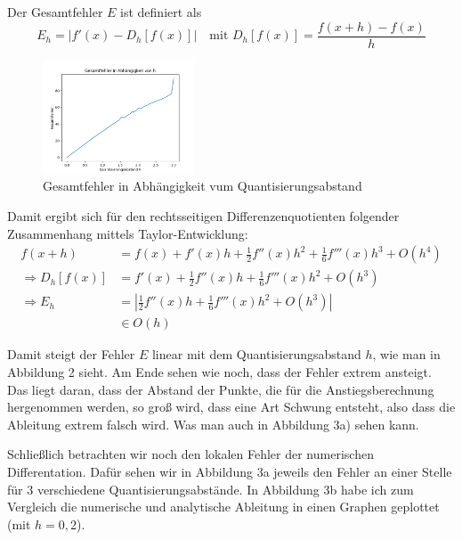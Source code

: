 \documentclass{article}
\begin{document}
	Der Gesamtfehler $E$ ist definiert als
	$$ E_h = |f'(x) - D_h[f(x)]|\quad\text{mit } D_h[f(x)] = \frac{f(x+h)-f(x)}{h} $$
	\begin{figure}
		\centering
		\includegraphics[width=0.4\textwidth]{Figure_2}
		\caption{Gesamtfehler in Abhängigkeit vum Quantisierungsabstand}
	\end{figure}
	Damit ergibt sich für den rechtsseitigen Differenzenquotienten folgender Zusammenhang mittels Taylor-Entwicklung:
	\begin{align*}
		f(x+h) &= f(x) + f'(x)h + \frac{1}{2}f''(x)h^2 + \frac{1}{6}f'''(x)h^3 + O(h^4)\\
		\Rightarrow D_h[f(x)] &= f'(x) + \frac{1}{2}f''(x)h+\frac{1}{6}f'''(x)h^2+O(h^3)\\
		\Rightarrow E_h &= \left| \frac{1}{2}f''(x)h+\frac{1}{6}f'''(x)h^2+O(h^3)\right|\\
		&\in O(h)
	\end{align*}

	Damit steigt der Fehler $E$ linear mit dem Quantisierungsabstand $h$, wie man in Abbildung 2 sieht. Am Ende sehen wie noch, dass der Fehler extrem ansteigt. Das liegt daran, dass der Abstand der Punkte, die für die Anstiegsberechnung hergenommen werden, so groß wird, dass eine Art Schwung entsteht, also dass die Ableitung extrem falsch wird. Was man auch in Abbildung 3a) sehen kann.
	
	Schließlich betrachten wir noch den lokalen Fehler der numerischen Differentation. Dafür sehen wir in Abbildung 3a jeweils den Fehler an einer Stelle für 3 verschiedene Quantisierungsabstände. In Abbildung 3b habe ich zum Vergleich die numerische und analytische Ableitung in einen Graphen geplottet (mit $h = 0,2$).
	
\end{document}
